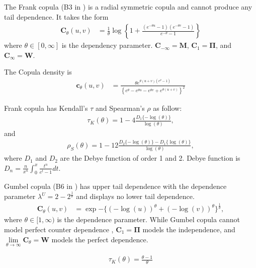 The Frank copula (B3 in \citet{joe1997multivariate}) is a radial symmetric copula and cannot produce any tail dependence.
It takes the form
\begin{align}
    \bm{C}_{\theta}(u,v) &= \frac{1}{\theta}
    \log \left\{
    1 + \frac{(e^{-\theta u}-1)(e^{-\theta v}-1)}{e^{-\theta}-1}
    \right\}
    \end{align}
where $\theta \in [0, \infty]$ is the dependency parameter.
$\bm{C}_{-\infty} = \bm{M}$, $\bm{C}_1 = \bm{\Pi}$, and $\bm{C}_\infty = \bm{W}$.

The Copula density is
\begin{align}
    \bm{c}_{\theta}(u,v) &= \frac{\theta e^{\theta(u+v)(e^\theta-1)}}
    {\left\{e^\theta-e^{\theta u}-e^{\theta v}+e^{\theta (u+v)}\right\}^2}
    \end{align}\medskip

Frank copula has Kendall's $\tau$ and Spearman's $\rho$ as follow:
\begin{align}
    \tau_K(\theta) = 1-4\frac{D_1\{-\log(\theta)\}}{\log(\theta)},
    \end{align}
and
\begin{align}
    \rho_S(\theta) = 1-12\frac{D_2\{-\log(\theta)\} - D_1\{\log(\theta)\}}{\log(\theta)},
    \end{align}
where $D_1$ and $D_2$ are the Debye function of order 1 and 2.
Debye function is $D_n = \frac{n}{x^n}\int_0^x\frac{t^n}{e^t-1}dt$.\medskip

Gumbel copula (B6 in \citet{joe1997multivariate}) has upper tail dependence with the dependence parameter
$\lambda^U = 2-2^{\frac{1}{\theta}}$ and displays no lower tail dependence.
\begin{align}
    \bm{C}_{\theta}(u,v) &= \exp{-\{
    (-\log(u))^\theta +(-\log(v))^\theta
    \}^{\frac{1}{\theta}}},
    \end{align}
where $\theta \in [1,\infty)$ is the dependence parameter.\medskip
While Gumbel copula cannot model perfect counter dependence \citep{Nelsen2002}, $\bm{C}_{1} = \bm{\Pi}$ models the independence,
and $\lim\limits_{\theta \to \infty} \bm{C}_\theta = \bm{W}$ models the perfect dependence.


  \begin{align}
    \tau_K(\theta) =\frac{\theta-1}{\theta}
    \end{align}

